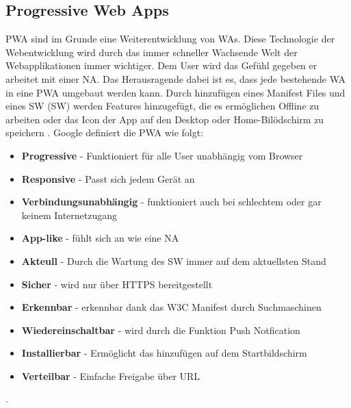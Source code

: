 \subsection{Progressive Web Apps}
\acl{PWA} sind im Grunde eine Weiterentwicklung von \acs{WA}s. Diese Technologie der Webentwicklung wird durch das immer schneller Wachsende Welt der Webapplikationen immer wichtiger. 
Dem User wird das Gefühl gegeben er arbeitet mit einer \acs{NA}. Das Herausragende dabei ist es, dass jede bestehende \acs{WA} in eine \acs{PWA} umgebaut werden kann.
Durch hinzufügen eines Manifest Files und eines \acl{SW} (\acs{SW}) werden Features hinzugefügt, die es ermöglichen Offline zu arbeiten oder das Icon der App auf den Desktop oder Home-Bilödschirm zu speichern \cite{PWA}.
Google definiert die \acs{PWA} wie folgt:


\begin{itemize}
    \item  \textbf{Progressive} - Funktioniert für alle User unabhängig vom Browser
	\item  \textbf{Responsive} - Passt sich jedem Gerät an	
	\item  \textbf{Verbindungsunabhängig} - funktioniert auch bei schlechtem oder gar keinem Internetzugang
	\item  \textbf{App-like} - fühlt sich an wie eine \acs{NA}
	\item  \textbf{Akteull} - Durch die Wartung des \acs{SW} immer auf dem aktuellsten Stand
	\item  \textbf{Sicher} - wird nur über HTTPS bereitgestellt
	\item  \textbf{Erkennbar} - erkennbar dank das W3C Manifest durch Suchmaschinen
	\item  \textbf{Wiedereinschaltbar} - wird durch die Funktion Push Notfication
	\item  \textbf{Installierbar} - Ermöglicht das hinzufügen auf dem Startbildschirm
	\item  \textbf{Verteilbar } - Einfache Freigabe über URL \cite{PWAAdjectives}
\end{itemize}. 




\newpage

